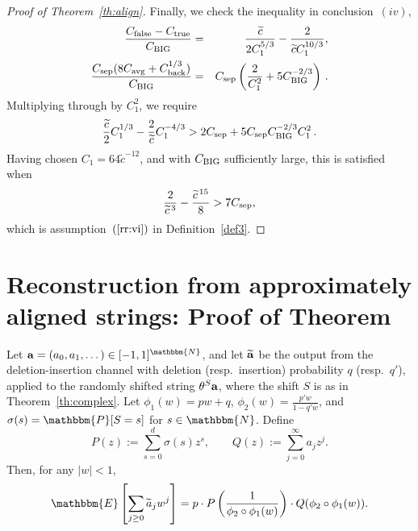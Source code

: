 \documentclass[final,12pt]{colt2018} %
\newcommand{\E}{\mathbbm{E}}
\newcommand{\N}{\mathbbm{N}}
\renewcommand{\P}{\mathbbm{P}}
\newcommand{\1}{\mathbf{1}}
\newcommand{\eqb}{\begin{equation}}
\newcommand{\eqe}{\end{equation}}
\newcommand{\eqbn}{\begin{equation*}}
\newcommand{\eqen}{\end{equation*}}
\newcommand{\wt}{\widetilde}
\def\aat{{\wt{a}}}
\def\at{{\wt {\bf a}}}
\def\a{{\bf a}}
\def\csep{C_{\rm sep}} %
\def\cback{C_{\rm back}}
\def\ctrue{C_{\rm true}}
\def\cfalse{C_{\rm false}}
\def\cavg{C_{\rm avg}}
\def\ct{{\wt c}}
\def\chuge{C_{\rm BIG}}
\begin{document}
\begin{proof}[Proof of Theorem~\ref{th:align}]
	Finally, we check the inequality in conclusion~$(iv)$,
	\begin{eqnarray*}
		\frac{\cfalse - \ctrue}{\chuge} & = & \frac{\ct}{2 C_1^{5/3}}
		- \frac{2}{\ct C_1^{10/3}}, \\
		\frac{\csep (8 \cavg + \cback^{1/3})}{\chuge} & = & \csep \left (
		\frac{2}{C_1^2} + 5 \chuge^{-2/3} \right ) \, .
	\end{eqnarray*}
	Multiplying through by $C_1^2$, we require
	$$\frac{\ct}{2} C_1^{1/3} - \frac{2}{\ct} C_1^{-4/3} > 2 \csep
	+ 5 \csep \chuge^{-2/3}C_1^2 \, .$$
	Having chosen $C_1 = 64 \ct^{-12}$, and with $\chuge$ sufficiently large, this is
	satisfied when
	$$\frac{2}{\ct^{\, 3}} - \frac{\ct^{\, 15}}{8} > 7 \csep,$$
	which is assumption~$(\ref{rr:vi})$ in Definition~\ref{def3}.
\end{proof}


\section{Reconstruction from approximately aligned strings: Proof of Theorem~\protect{\ref{th:complex}}} \label{sec:recover}

\begin{lemma} \label{prop15}
	Let $\a=(a_0,a_1,\dots)\in[-1,1]^{\N}$, and let
	$\at$ be the output from the
	deletion-insertion channel with deletion (resp.\ insertion) probability $q$ (resp.\ $q'$), applied to the randomly shifted string $\theta^{S}\a$, where the shift $S$ is as in
	Theorem~\ref{th:complex}.  Let $\phi_1(w)=pw+q$,
	$\phi_2(w) = \frac{p'w}{1-q' w}$, and $\sigma(s)=\P[S=s]$ for $s\in\N$.
	Define
	\eqbn
	P(z):=\sum_{s=0}^{d} \sigma(s) z^s,\qquad
	Q(z):=\sum_{j= 0}^\infty a_j z^j.
	\eqen
	Then, for any $|w|<1$,
	\eqb \label{eq5}
	\E\left[ \sum_{j\geq 0} \aat_j w^j \right]
	= p\cdot P\left(\frac{1}{\phi_2\circ\phi_1(w)} \right ) \cdot
	Q(\phi_2\circ\phi_1(w)).
	\eqe
\end{lemma}
\end{document}
